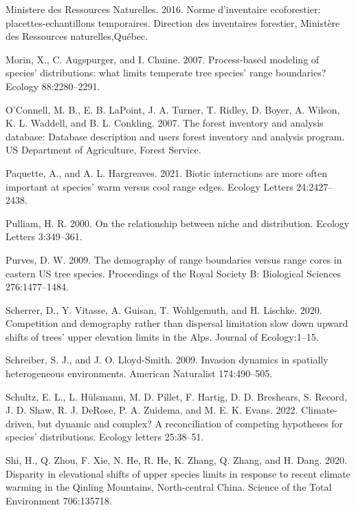 \documentclass[12pt]{article}
\newlength{\cslhangindent}
\newenvironment{cslreferences}%
  {\setlength{\parindent}{0pt}%
  \everypar{\setlength{\hangindent}{\cslhangindent}}\ignorespaces}%
  {\par}
\begin{document}
\begin{cslreferences}
\leavevmode\hypertarget{ref-Naturelles2016}{}%
Ministere des Ressources Naturelles. 2016. Norme d'inventaire
ecoforestier: placettes-echantillons temporaires. Direction des
inventaires forestier, Ministère des Ressources naturelles,Québec.

\leavevmode\hypertarget{ref-Morin2007}{}%
Morin, X., C. Augspurger, and I. Chuine. 2007. Process-based modeling of
species' distributions: what limits temperate tree species' range
boundaries? Ecology 88:2280--2291.

\leavevmode\hypertarget{ref-OConnell2007}{}%
O'Connell, M. B., E. B. LaPoint, J. A. Turner, T. Ridley, D. Boyer, A.
Wilson, K. L. Waddell, and B. L. Conkling. 2007. The forest inventory
and analysis database: Database description and users forest inventory
and analysis program. US Department of Agriculture, Forest Service.

\leavevmode\hypertarget{ref-Paquette2021}{}%
Paquette, A., and A. L. Hargreaves. 2021. Biotic interactions are more
often important at species' warm versus cool range edges. Ecology
Letters 24:2427--2438.

\leavevmode\hypertarget{ref-Pulliam2000}{}%
Pulliam, H. R. 2000. On the relationship between niche and distribution.
Ecology Letters 3:349--361.

\leavevmode\hypertarget{ref-Purves2009}{}%
Purves, D. W. 2009. The demography of range boundaries versus range
cores in eastern US tree species. Proceedings of the Royal Society B:
Biological Sciences 276:1477--1484.

\leavevmode\hypertarget{ref-Scherrer2020}{}%
Scherrer, D., Y. Vitasse, A. Guisan, T. Wohlgemuth, and H. Lischke.
2020. Competition and demography rather than dispersal limitation slow
down upward shifts of trees' upper elevation limits in the Alps. Journal
of Ecology:1--15.

\leavevmode\hypertarget{ref-Schreiber2009}{}%
Schreiber, S. J., and J. O. Lloyd-Smith. 2009. Invasion dynamics in
spatially heterogeneous environments. American Naturalist 174:490--505.

\leavevmode\hypertarget{ref-schultz2022}{}%
Schultz, E. L., L. Hülsmann, M. D. Pillet, F. Hartig, D. D. Breshears,
S. Record, J. D. Shaw, R. J. DeRose, P. A. Zuidema, and M. E. K. Evans.
2022. Climate-driven, but dynamic and complex? A reconciliation of
competing hypotheses for species' distributions. Ecology letters
25:38--51.

\leavevmode\hypertarget{ref-Shi2020}{}%
Shi, H., Q. Zhou, F. Xie, N. He, R. He, K. Zhang, Q. Zhang, and H. Dang.
2020. Disparity in elevational shifts of upper species limits in
response to recent climate warming in the Qinling Mountains,
North-central China. Science of the Total Environment 706:135718.


\end{cslreferences}
\end{document}
